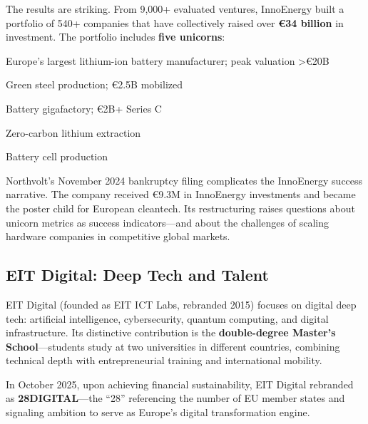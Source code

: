 \documentclass[../main.tex]{subfiles}
\begin{document}
The results are striking. From 9,000+ evaluated ventures, InnoEnergy built a portfolio of 540+ companies that have collectively raised over \textbf{€34 billion} in investment. The portfolio includes \textbf{five unicorns}:

\begin{description}[leftmargin=0.5cm, itemsep=0.2em]
\item[Northvolt] Europe's largest lithium-ion battery manufacturer; peak valuation >€20B
\item[H2 Green Steel] Green steel production; €2.5B mobilized
\item[Verkor] Battery gigafactory; €2B+ Series C
\item[Vulcan Energy] Zero-carbon lithium extraction
\item[Freyr] Battery cell production
\end{description}

\begin{criticalbox}
Northvolt's November 2024 bankruptcy filing complicates the InnoEnergy success narrative. The company received €9.3M in InnoEnergy investments and became the poster child for European cleantech. Its restructuring raises questions about unicorn metrics as success indicators---and about the challenges of scaling hardware companies in competitive global markets.
\end{criticalbox}

\subsection*{EIT Digital: Deep Tech and Talent}

EIT Digital (founded as EIT ICT Labs, rebranded 2015) focuses on digital deep tech: artificial intelligence, cybersecurity, quantum computing, and digital infrastructure. Its distinctive contribution is the \textbf{double-degree Master's School}---students study at two universities in different countries, combining technical depth with entrepreneurial training and international mobility.

In October 2025, upon achieving financial sustainability, EIT Digital rebranded as \textbf{28DIGITAL}---the ``28'' referencing the number of EU member states and signaling ambition to serve as Europe's digital transformation engine.
\end{document}
